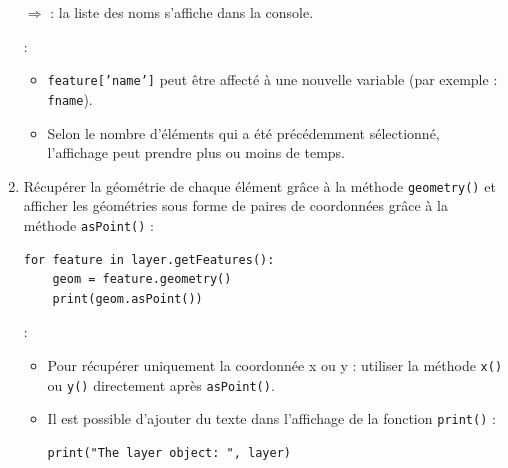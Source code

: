 \documentclass[11pt]{article}
\begin{document}
\begin{enumerate}
$\Rightarrow$ \underline{}: la liste des noms s'affiche dans la console.

\vspace*{1em}
\underline{}:
\begin{itemize}\itemsep0.2em
\renewcommand\labelitemi{\--}
\item \og{}\texttt{feature['name']}\fg{} peut être affecté à une nouvelle variable (par exemple : \texttt{fname}).
\item Selon le nombre d'éléments qui a été précédemment sélectionné, l'affichage peut prendre plus ou moins de temps. 
\end{itemize}

\item Récupérer la géométrie de chaque élément grâce à la méthode \texttt{geometry()} et afficher les géométries sous forme de paires de coordonnées grâce à la méthode \texttt{asPoint()} : 
\vspace*{-1em}
\begin{center}
\begin{minipage}[t]{0.42\textwidth}
\begin{verbatim}
for feature in layer.getFeatures():
    geom = feature.geometry()
    print(geom.asPoint())
\end{verbatim}
\end{minipage}
\end{center}






\newpage{}
\underline{}:
\begin{itemize}\itemsep0.2em
\renewcommand\labelitemi{\--}
\item Pour récupérer uniquement la coordonnée x ou y : utiliser la méthode \texttt{x()} ou \texttt{y()} directement après \texttt{asPoint()}. 
\item Il est possible d'ajouter du texte dans l'affichage de la fonction \texttt{print()} :
\vspace*{-0.64em}
\begin{center}
\begin{minipage}[t]{0.40\textwidth}
\begin{verbatim}
print("The layer object: ", layer)
\end{verbatim}
\end{minipage}
\end{center}
\vspace*{1em}


\end{itemize}
\end{enumerate}
\end{document}
